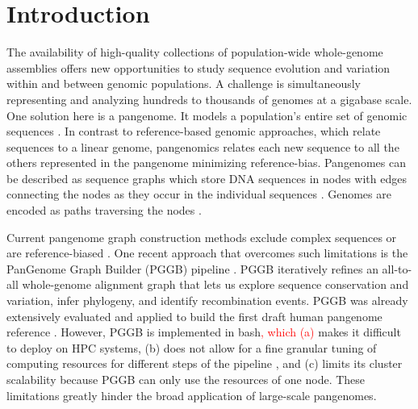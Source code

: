 \documentclass{bioinfo}
\theoremstyle{definition}
\newcommand{\red}[1]{{\textcolor{Red}{#1}}}
\begin{document}
	\section{Introduction}
	The availability of high-quality collections of population-wide whole-genome assemblies \citep{Liao2023, Kang2023, Weller2023, Zhou2022, Liu2020, Leonard2022} offers new opportunities to study sequence evolution and variation within and between genomic populations. 
	A challenge is simultaneously representing and analyzing hundreds to thousands of genomes at a gigabase scale. 
	One solution here is a pangenome. It models a population's entire set of genomic sequences \citep{Ballouz2019}. 
	In contrast to reference-based genomic approaches, which relate sequences to a linear genome, pangenomics relates each new sequence to all the others represented in the pangenome \citep{CompPan2016, Eizenga_2020, Sherman_2020} minimizing reference-bias. 
	Pangenomes can be described as sequence graphs which store DNA sequences in nodes with edges connecting the nodes as they occur in the individual sequences \citep{Hein1989}. 
	Genomes are encoded as paths traversing the nodes \citep{Garrison:2018}.
	
	Current pangenome graph construction methods exclude complex sequences or are reference-biased \citep{Chin2023, Minkin2016}.
	One recent approach that overcomes such limitations is the PanGenome Graph Builder (PGGB) pipeline \citep{Garrison2023}. 
	PGGB iteratively refines an all-to-all whole-genome alignment graph that lets us explore sequence conservation and variation, infer phylogeny, and identify recombination events. 
	PGGB was already extensively evaluated \citep{Garrison2023, Andreace2023} and applied to build the first draft human pangenome reference \citep{Liao2023}.
	However, PGGB is implemented in bash\red{, which (a)} makes it difficult to deploy on HPC systems, (b) does not allow for a fine granular tuning of computing resources for different steps of the pipeline \citep{Sztuka2024}, and (c) limits its cluster scalability because PGGB can only use the resources of one node. These limitations greatly hinder the broad application of large-scale pangenomes.
	
\end{document}

